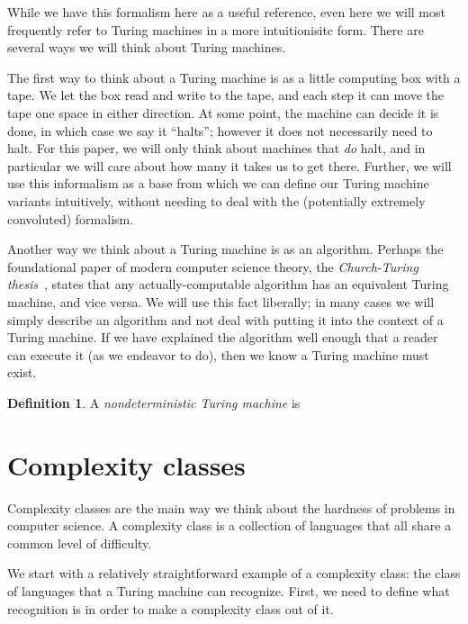 \documentclass[english]{reedthesis}
\theoremstyle{plain}
\theoremstyle{definition}
\newtheorem{defn}[defn]{Definition}
\theoremstyle{remark}
\begin{document}
While we have this formalism here as a useful reference, even here we will most
frequently refer to Turing machines in a more intuitionisitc form. There are
several ways we will think about Turing machines.

The first way to think about a Turing machine is as a little computing box with
a tape. We let the box read and write to the tape, and each step it can move the
tape one space in either direction. At some point, the machine can decide it is
done, in which case we say it ``halts''; however it does not necessarily need to
halt. For this paper, we will only think about machines that \emph{do} halt, and
in particular we will care about how many it takes us to get there. Further, we
will use this informalism as a base from which we can define our Turing machine
variants intuitively, without needing to deal with the (potentially extremely
convoluted) formalism.

Another way we think about a Turing machine is as an algorithm. Perhaps the
foundational paper of modern computer science theory, the \emph{Church-Turing
  thesis}~\cite{Tur36}, states that any actually-computable algorithm has an
equivalent Turing machine, and vice versa. We will use this fact liberally; in
many cases we will simply describe an algorithm and not deal with putting it
into the context of a Turing machine. If we have explained the algorithm well
enough that a reader can execute it (as we endeavor to do), then we know a
Turing machine must exist.

\begin{defn}\label{def:nondeterministic-tm}
  A \emph{nondeterministic Turing machine} is %
\end{defn}

\section{Complexity classes}


Complexity classes are the main way we think about the hardness of problems in
computer science. A complexity class is a collection of
languages that all share a common level of difficulty.

We start with a relatively straightforward example of a complexity class: the
class of languages that a Turing machine can recognize. First, we need to
define what recognition is in order to make a complexity class out of it.
\end{document}
